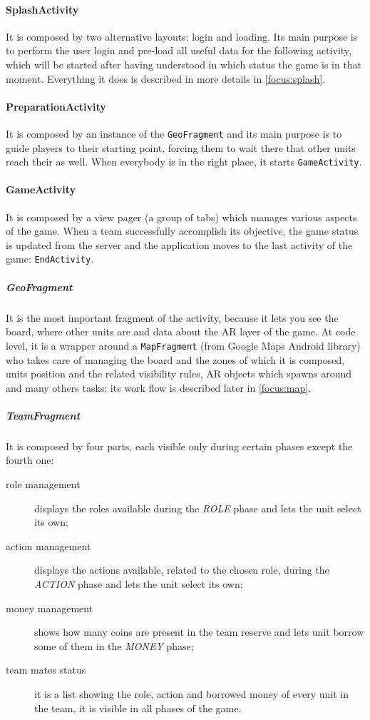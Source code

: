 		\paragraph{SplashActivity}
		
		It is composed by two alternative layouts: login and loading.
		Its main purpose is to perform the user login and pre-load all useful data for the following activity, which will be started after having understood in which status the game is in that moment.
		Everything it does is described in more details in \autoref{focus:splash}.
		
		\paragraph{PreparationActivity}
		
		It is composed by an instance of the \lstinline|GeoFragment| and its main purpose is to guide players to their starting point, forcing them to wait there that other units reach their as well. When everybody is in the right place, it starts \lstinline|GameActivity|.
		
		\paragraph{GameActivity}
			
		It is composed by a view pager (a group of tabs) which manages various aspects of the game.
		When a team successfully accomplish its objective, the game status is updated from the server and the application moves to the last activity of the game: \lstinline|EndActivity|.
		
			\subparagraph{GeoFragment}
			
			It is the most important fragment of the activity, because it lets you see the board, where other units are and data about the AR layer of the game.
			At code level, it is a wrapper around a \lstinline|MapFragment| (from Google Maps Android library) who takes care of managing the board and the zones of which it is composed, units position and the related visibility rules, AR objects which spawns around and many others tasks: its work flow is described later in \autoref{focus:map}.
			
			\subparagraph{TeamFragment}
			
			It is composed by four parts, each visible only during certain phases except the fourth one:
			\begin{description}
				\item[role management] displays the roles available during the \emph{ROLE} phase and lets the unit select its own;
				\item[action management] displays the actions available, related to the chosen role, during the \emph{ACTION} phase and lets the unit select its own;
				\item[money management] shows how many coins are present in the team reserve and lets unit borrow some of them in the \emph{MONEY} phase;
				\item[team mates status] it is a list showing the role, action and borrowed money of every unit in the team, it is visible in all phases of the game.
			\end{description}
			
